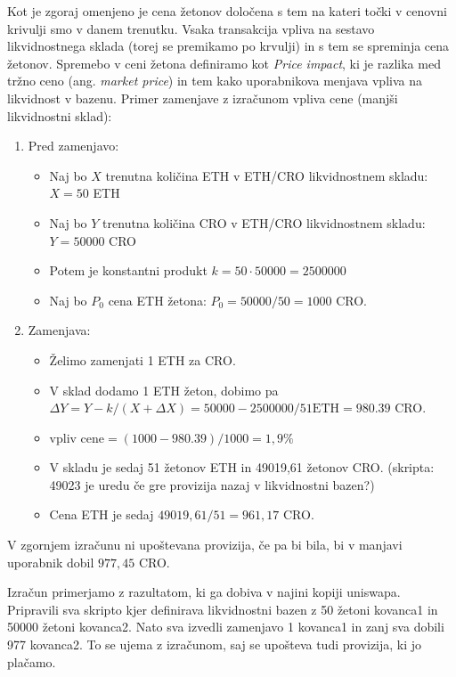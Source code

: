 \documentclass[a4paper,12pt]{article}%
\begin{document}
Kot je zgoraj omenjeno je cena žetonov določena s tem na kateri točki v cenovni krivulji smo v danem trenutku. Vsaka transakcija vpliva na sestavo likvidnostnega sklada (torej se premikamo po krvulji) in s tem se spreminja cena žetonov. Spremebo v ceni žetona definiramo kot \textit{Price impact}, ki je razlika med tržno ceno (ang. \textit{market price}) in tem kako uporabnikova menjava vpliva na likvidnost v bazenu. 
\newline
Primer zamenjave z izračunom vpliva cene (manjši likvidnostni sklad):
\begin{enumerate}
    \item Pred zamenjavo:
    \begin{itemize}
        \item Naj bo $X$ trenutna količina ETH v ETH/CRO likvidnostnem skladu: $X = 50$ ETH
        \item Naj bo $Y$ trenutna količina CRO v ETH/CRO likvidnostnem skladu: $Y = 50 000$ CRO 
        \item Potem je konstantni produkt $k = 50 \cdot 50 000 = 2 500 000$
        \item Naj bo $P_0$ cena ETH žetona: $P_0 = 50000/50 = 1000$ CRO. 
    \end{itemize}
    \item Zamenjava: 
    \begin{itemize}
        \item Želimo zamenjati 1 ETH za CRO.
        \item V sklad dodamo 1 ETH žeton, dobimo pa $\Delta Y = Y - k/(X+\Delta X) = 50 000 - 2 500 000/{51 \text{ETH}} = 980.39$ CRO.
        \item $\text{vpliv cene} = (1000 - 980.39)/1000 =  1,9 \%  $   
        \item V skladu je sedaj 51 žetonov ETH in 49019,61 žetonov CRO.   (skripta:  49023 je uredu če gre provizija nazaj v likvidnostni bazen?)
        \item Cena ETH je sedaj $49019,61/51 = 961,17$ CRO.
    \end{itemize}
\end{enumerate}

V zgornjem izračunu ni upoštevana provizija, če pa bi bila, bi v manjavi uporabnik dobil $977,45$ CRO.

Izračun primerjamo z razultatom, ki ga dobiva v najini kopiji uniswapa. Pripravili sva skripto kjer definirava likvidnostni bazen z 50 žetoni kovanca1 in 50000 žetoni kovanca2. Nato sva izvedli zamenjavo 1 kovanca1 in zanj sva dobili 977 kovanca2. To se ujema z izračunom, saj se upošteva tudi provizija, ki jo plačamo. 
\end{document}
